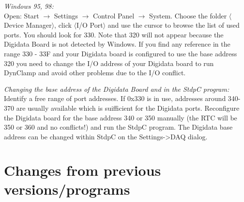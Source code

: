 \documentclass{article}
\begin{document}
\noindent
{\em Windows 95, 98: } \\ Open: Start $\rightarrow$ Settings
$\rightarrow$ Control Panel $\rightarrow$ System. Choose the folder
$\langle$Device Manager$\rangle$, click $\langle$I/O Port$\rangle$ and
use the cursor to browse the list of used ports. You should look for
330.  Note that 320 will not appear because the Digidata Board is not
detected by Windows. If you find any reference in the range 330 - 33F
and your Digidata board is configured to use the base address 320 you
need to change the I/O address of your Digidata board to run DynClamp
and avoid other problems due to the I/O conflict.
 
\noindent
{\em Changing the base address of the Digidata Board and in the StdpC
  program: } \\ Identify a free range of port addresses.  If 0x330 is
in use, addresses around 340-370 are usually available which is
suifficient for the Digidata ports. Reconfigure the Digidata
board for the base address 340 or 350 manually (the RTC will be 350 or
360 and no conflicts!) and run the StdpC program. The Digidata base
address can be changed within StdpC on the Settings->DAQ dialog.

\section{Changes from previous versions/programs}
\end{document}
